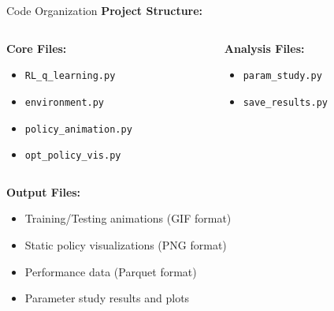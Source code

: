 \documentclass[aspectratio=169]{beamer}
\begin{document}
\begin{frame}{Code Organization}
    \textbf{Project Structure:}
    
    \vspace{0.5cm}
    \begin{columns}
        \begin{column}{0.5\textwidth}
            \textbf{Core Files:}
            \begin{itemize}
                \item \texttt{RL\_q\_learning.py}
                \item \texttt{environment.py}
                \item \texttt{policy\_animation.py}
                \item \texttt{opt\_policy\_vis.py}
            \end{itemize}
        \end{column}
        
        \begin{column}{0.5\textwidth}
            \textbf{Analysis Files:}
            \begin{itemize}
                \item \texttt{param\_study.py}
                \item \texttt{save\_results.py}
            \end{itemize}
        \end{column}
    \end{columns}
    
    \vspace{0.5cm}
    \textbf{Output Files:}
    \begin{itemize}
        \item Training/Testing animations (GIF format)
        \item Static policy visualizations (PNG format)
        \item Performance data (Parquet format)
        \item Parameter study results and plots
    \end{itemize}
\end{frame}
\end{document}
